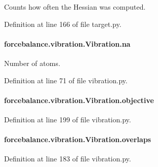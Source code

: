 Counts how often the Hessian was computed. 



Definition at line 166 of file target.\-py.

\hypertarget{classforcebalance_1_1vibration_1_1Vibration_a31148c4d3157dddf2485c4e63496e120}{
\paragraph[{na}]{\setlength{\rightskip}{0pt plus 5cm}forcebalance.\-vibration.\-Vibration.\-na}}\label{classforcebalance_1_1vibration_1_1Vibration_a31148c4d3157dddf2485c4e63496e120}


Number of atoms. 



Definition at line 71 of file vibration.\-py.

\hypertarget{classforcebalance_1_1vibration_1_1Vibration_a78813cc16da8d8c6a8113e3301c96c0d}{
\paragraph[{objective}]{\setlength{\rightskip}{0pt plus 5cm}forcebalance.\-vibration.\-Vibration.\-objective}}\label{classforcebalance_1_1vibration_1_1Vibration_a78813cc16da8d8c6a8113e3301c96c0d}


Definition at line 199 of file vibration.\-py.

\hypertarget{classforcebalance_1_1vibration_1_1Vibration_a9ce45d9b33c510d6c1bc78f5f09b1981}{
\paragraph[{overlaps}]{\setlength{\rightskip}{0pt plus 5cm}forcebalance.\-vibration.\-Vibration.\-overlaps}}\label{classforcebalance_1_1vibration_1_1Vibration_a9ce45d9b33c510d6c1bc78f5f09b1981}


Definition at line 183 of file vibration.\-py.

